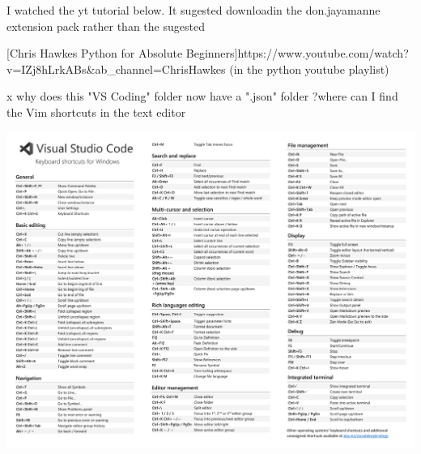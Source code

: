 I watched the yt tutorial below. It sugested downloadin the
don.jayamanne extension pack rather than the sugested

[Chris Hawkes Python for Absolute Beginners]{https://www.youtube.com/watch?v=IZj8hLrkABs\&ab_channel=ChrisHawkes}
(in the python youtube playlist)

x why does this "VS Coding" folder now have a ".json" folder ?where can I
find the Vim shortcuts in the text editor

\includegraphics{keyboard-shortcuts-windows (1)-1.png}

